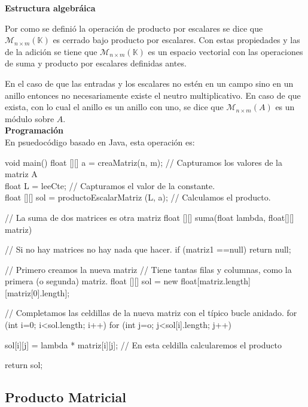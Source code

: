 \documentclass[10pt]{article}
\begin{document}
\noindent\textbf{Estructura algebráica}


Por como se definió la operación de producto por escalares se dice que $\mathcal{M}_{n\times {m}}(\mathbb{K})$ es cerrado bajo producto por escalares. Con estas propiedades y las de la adición se tiene que $\mathcal{M}_{n\times {m}}(\mathbb{K})$ es un espacio vectorial con las operaciones de suma y producto por escalares definidas antes.

En el caso de que las entradas y los escalares no estén en un campo sino en un anillo entonces no necesariamente existe el neutro multiplicativo. En caso de que exista, con lo cual el anillo es un anillo con uno, se dice que $\mathcal{M}_{n\times {m}}(A)$ es un módulo sobre $A$. \\

\noindent\textbf{Programación} \\

En psuedocódigo basado en Java, esta operación es:

\begin{code}[caption=Suma de Matrices, label=default]
void main() {
  float [][] a = creaMatriz(n, m); // Capturamos los valores de la matriz A \\
  float L = leeCte; // Capturamos el valor de la constante. \\
  float [][] sol = productoEscalarMatriz (L, a); // Calculamos el producto. \\
} 

// La suma de dos matrices es otra matriz
float [][] suma(float lambda, float[][] matriz) {
   // Si no hay matrices no hay nada que hacer.
   if (matriz1 ==null) return null;
   
   // Primero creamos la nueva matriz
   // Tiene tantas filas y columnas, como la primera (o segunda) matriz.
   float [][] sol = new float[matriz.length][matriz[0].length];
   
   // Completamos las celdillas de la nueva matriz con el típico bucle anidado.
   for (int i=0; i<sol.length; i++)
     for (int j=o; j<sol[i].length; j++)
     
       sol[i][j] = lambda * matriz[i][j]; // En esta celdilla calcularemos el producto
       
   return sol;
}    
\end{code}
\subsection{Producto Matricial}
\end{document}
